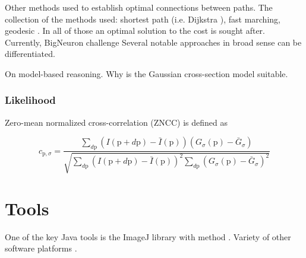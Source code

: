 Other methods used to establish optimal connections between paths.
The collection of the methods used: shortest path (i.e. Dijkstra \cite{dijkstra1959note}), fast marching, geodesic . In all of those an optimal solution to the cost is sought after. Currently, BigNeuron challenge Several notable approaches in broad sense can be differentiated.

On model-based reasoning. Why is the Gaussian cross-section model \cite{zhao2011automated,radojevic2017neuron} suitable.

\subsubsection{Likelihood}
Zero-mean normalized cross-correlation (ZNCC) is defined as 

\begin{equation}
c_{\mathrm{p}, \sigma} = \frac{ \sum\limits_{d\mathrm{p}} (I(\mathrm{p} + d\mathrm{p}) - \bar{I}(\mathrm{p}))(G_{\sigma}(\mathrm{p}) - \bar{G}_{\sigma}) }{ \sqrt{ \sum\limits_{d\mathrm{p}}(I(\mathrm{p} + d\mathrm{p}) - \bar{I}(\mathrm{p}))^2 \sum\limits_{d\mathrm{p}}(G_{\sigma}(\mathrm{p}) - \bar{G}_{\sigma})^2 } }
\label{ch1_eq1}
\end{equation}

\section{Tools}
One of the key Java tools is the ImageJ library \cite{abramoff2004image} with method \cite{longair2011simple,pool2008neuritetracer}. Variety of other software platforms \cite{meijering2010neuron,acciai2016automated}. 

